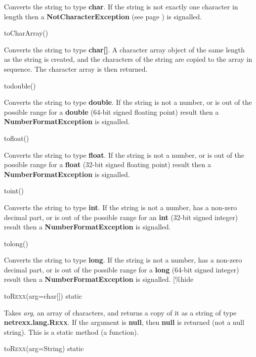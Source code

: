 \begin{description}
Converts the string to type \textbf{char}.  If the string is
not exactly one character in length then
a  \textbf{NotCharacterException} (see page \pageref{refexpnce})  is signalled.
\item{toCharArray()}

Converts the string to type \textbf{char[]}.  A character array object
of the same length as the string is created, and the characters of the
string are copied to the array in sequence.  The character array is then
returned.
\item{todouble()}

Converts the string to type \textbf{double}.  If the string is
not a number, or is out of the possible range for a \textbf{double}
(64-bit signed floating point) result then a \textbf{NumberFormatException}
is signalled.
\item{tofloat()}

Converts the string to type \textbf{float}.  If the string is
not a number, or is out of the possible range for a \textbf{float}
(32-bit signed floating point) result then a \textbf{NumberFormatException}
is signalled.
\item{toint()}

Converts the string to type \textbf{int}.  If the string is
not a number, has a non-zero decimal part, or is out of the possible
range for an \textbf{int} (32-bit signed integer) result then
a \textbf{NumberFormatException} is signalled.
\item{tolong()}

Converts the string to type \textbf{long}.  If the string is
not a number, has a non-zero decimal part, or is out of the possible
range for a \textbf{long} (64-bit signed integer) result then
a \textbf{NumberFormatException} is signalled.
[\%hide
\item{toR\textsc{exx}(arg=char[]) static}

Takes \emph{arg}, an array of characters, and returns a copy
of it as a string of type \textbf{netrexx.lang.R\textsc{exx}}.
If the argument is \textbf{null}, then \textbf{null} is returned
(not a null string).
This is a static method (a function).
\item{toR\textsc{exx}(arg=String) static}


\end{description}

